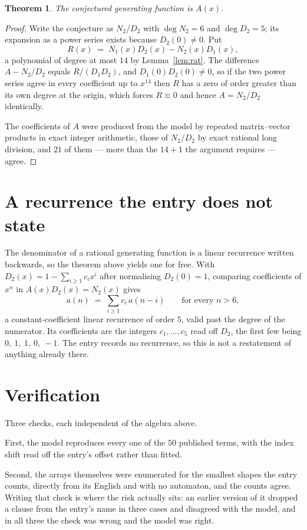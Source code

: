 \documentclass[11pt,a4paper]{article}
\theoremstyle{plain}
\newtheorem{theorem}{Theorem}
\theoremstyle{definition}
\begin{document}
\begin{theorem}
The conjectured generating function is $A(x)$.
\end{theorem}

\begin{proof}
Write the conjecture as $N_2/D_2$ with $\deg N_2=6$ and $\deg D_2=5$; its expansion as a
power series exists because $D_2(0)\neq0$. Put
\[
R(x)\;=\;N_1(x)D_2(x)-N_2(x)D_1(x),
\]
a polynomial of degree at most $14$ by Lemma~\ref{lem:rat}. The difference
$A-N_2/D_2$ equals $R/(D_1D_2)$, and $D_1(0)D_2(0)\neq0$, so if the two power series agree in
every coefficient up to $x^{14}$ then $R$ has a zero of order greater than its own
degree at the origin, which forces $R\equiv0$ and hence $A=N_2/D_2$ identically.

The coefficients of $A$ were produced from the model by repeated matrix--vector products in
exact integer arithmetic, those of $N_2/D_2$ by exact rational long division, and $21$
of them --- more than the $14+1$ the argument requires --- agree.
\end{proof}

\section{A recurrence the entry does not state}

The denominator of a rational generating function is a linear recurrence written backwards, so
the theorem above yields one for free. With $D_2(x)=1-\sum_{i\ge1}c_ix^i$ after normalising
$D_2(0)=1$, comparing coefficients of $x^n$ in $A(x)D_2(x)=N_2(x)$ gives
\[
a(n)\;=\;\sum_{i\ge1}c_i\,a(n-i)\qquad\text{for every }n>6,
\]
a constant-coefficient linear recurrence of order $5$, valid past the degree of the
numerator. Its coefficients are the integers $c_1,\dots,c_{5}$ read off $D_2$, the first few being $0,\ 1,\ 1,\ 0,\ -1$. The entry records no recurrence, so this is not a restatement of anything
already there.

\section{Verification}

Three checks, each independent of the algebra above.

First, the model reproduces every one of the $50$ published terms, with the index shift
read off the entry's offset rather than fitted.

Second, the arrays themselves were enumerated for the smallest shapes the entry counts,
directly from its English and with no automaton, and the counts agree. Writing that check is
where the risk actually sits: an earlier version of it dropped a clause from the entry's name
in three cases and disagreed with the model, and in all three the check was wrong and the model
was right.
\end{document}

